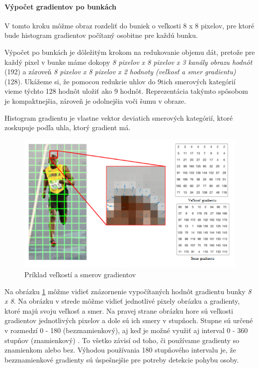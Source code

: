 \paragraph{Výpočet gradientov po bunkách}

V tomto kroku môžme obraz rozdeliť do buniek o veľkosti  8 x 8 pixelov, pre ktoré bude histogram gradientov počítaný osobitne pre každú bunku.

Výpočet po bunkách je dôležitým krokom na redukovanie objemu dát, pretože pre každý pixel v bunke máme dokopy\textit{ 8 pixelov x 8 pixelov x 3 kanály obrazu hodnôt }(192) a zároveň \textit{8 pixelov x 8 pixelov x 2 hodnoty (veľkosť a smer gradientu)} (128). Ukážeme si, že pomocou redukcie uhlov do 9tich smerových kategórií vieme týchto 128 hodnôt uložiť ako 9 hodnôt. Reprezentácia takýmto spôsobom je kompaktnejšia, zároveň je odolnejšia voči šumu v obraze. 

Histogram gradientu je vlastne vektor deviatich smerových kategórií, ktoré zoskupuje podľa uhla, ktorý gradient má. 

\begin{figure}[H]
  \centering
  \includegraphics[width=16cm]{img/HOGgrad.png}
  \caption{Príklad veľkostí a smerov gradientov \cite{c20}}
  \label{HOGgrad}
\end{figure}
Na obrázku \ref{HOGgrad} môžme vidieť znázornenie vypočítaných hodnôt gradientu bunky \textit{8 x 8}. Na obrázku v strede môžme vidieť jednotlivé pixely obrázku a gradienty, ktoré majú svoju veľkosť a smer. Na pravej strane obrázku hore sú veľkosti gradientov jednotlivých pixelov a dole sú ich smery v stupňoch. Stupne sú určené v rozmedzí 0 - 180 (bezznamienkový), aj keď je možné využiť aj interval 0 - 360 stupňov (znamienkový) . To všetko závisí od toho, či používame gradienty so znamienkom alebo bez. Výhodou používania 180 stupňového intervalu je, že bezznamienkové gradienty sú úspešnejšie pre potreby detekcie pohybu osoby. 

